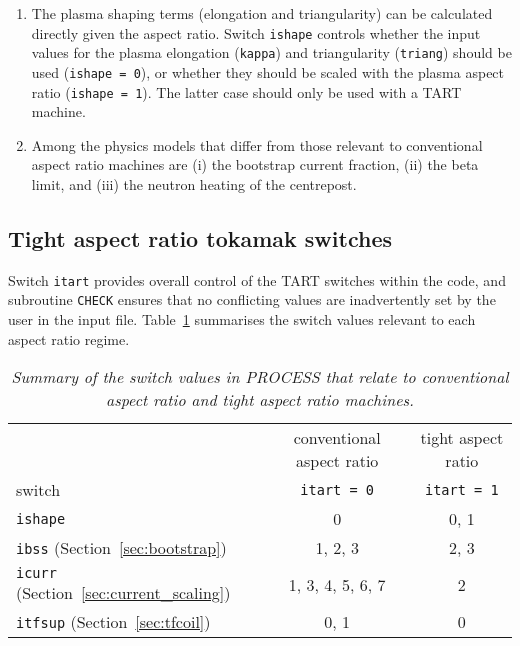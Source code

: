 \documentclass[11pt,a4paper]{report}
\newcommand{\process}{\mbox{\texttt{PROCESS}}}
\begin{document}
\begin{enumerate}
\item The plasma shaping terms (elongation and triangularity) can be
  calculated directly given the aspect ratio. Switch \texttt{ishape} controls
  whether the input values for the plasma elongation (\texttt{kappa}) and
  triangularity (\texttt{triang}) should be used (\texttt{ishape = 0}), or
  whether they should be scaled with the plasma aspect ratio (\texttt{ishape =
    1}). The latter case should only be used with a TART machine.

\item Among the physics models that differ from those relevant to conventional
  aspect ratio machines are (i) the bootstrap current fraction, (ii) the
  beta limit, and (iii) the neutron heating of the centrepost.

\end{enumerate}

\subsection{Tight aspect ratio tokamak switches}

Switch \texttt{itart} provides overall control of the TART switches within the
code, and subroutine \texttt{CHECK} ensures that no conflicting values are
inadvertently set by the user in the input file. Table~\ref{tab:tart}
summarises the switch values relevant to each aspect ratio regime.
\begin{table}[tbph]
\begin{center}
  \begin{tabular}{||l|c|c||} \hline
    & conventional aspect ratio & tight aspect ratio \\
    switch & \texttt{itart = 0} & \texttt{itart = 1} \\ \hline
    \texttt{ishape} & 0 & 0, 1 \\
    \texttt{ibss} (Section~\ref{sec:bootstrap}) & 1, 2, 3 & 2, 3 \\
    \texttt{icurr} (Section~\ref{sec:current_scaling}) & 1, 3, 4, 5, 6, 7 & 2 \\
    \texttt{itfsup} (Section~\ref{sec:tfcoil}) & 0, 1 & 0 \\
    \hline
\end{tabular}
\end{center}
\caption[\process\/ switches for tight aspect ratio machines]
{\label{tab:tart}
  \textit{Summary of the switch values in PROCESS that relate to
    conventional aspect ratio and tight aspect ratio machines.}
}
\end{table}
\end{document}
